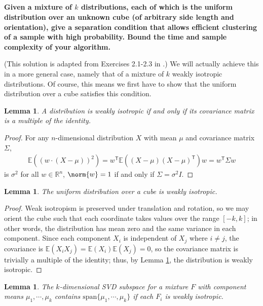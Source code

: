 \documentclass[a4paper,12pt]{article}
\newtheorem{lemma}[theorem]{Lemma}
\theoremstyle{remark}
\newcommand{\transpose}{\mathsf{T}}
\begin{document}
\subsection{}
    \boldmath\textbf{Given a mixture of $k$ distributions, each of which is the uniform distribution over an unknown cube (of arbitrary side length and orientation), give a separation condition that allows efficient clustering of a sample with high probability. Bound the time and sample complexity of your algorithm.
    }\unboldmath \par
    (This solution is adapted from Exercises 2.1-2.3 in \cite{spectral}.) We will actually achieve this in a more general case, namely that of a mixture of $k$ weakly isotropic distributions. Of course, this means we first have to show that the uniform distribution over a cube satisfies this condition.
    \begin{lemma} \label{lem:iso-cov}
        A distribution is weakly isotropic if and only if its covariance matrix is a multiple of the identity.
    \end{lemma}
    \begin{proof}
        For any $n$-dimensional distribution $X$ with mean $\mu$ and covariance matrix $\Sigma$,
        \begin{align*}
            \mathbb{E}((w \cdot (X - \mu))^2) = w^\transpose \mathbb{E}((X - \mu)(X - \mu)^\transpose) w = w^\transpose \Sigma w
        \end{align*}
        is $\sigma^2$ for all $w \in \mathbb{R}^n$, $\norm{w} = 1$ if and only if $\Sigma = \sigma^2 I$.
    \end{proof}
    \begin{lemma}
        The uniform distribution over a cube is weakly isotropic.
    \end{lemma}
    \begin{proof}
        Weak isotropism is preserved under translation and rotation, so we may orient the cube such that each coordinate takes values over the range $[-k, k]$; in other words, the distribution has mean zero and the same variance in each component. Since each component $X_i$ is independent of $X_j$ where $i \neq j$, the covariance is $\mathbb{E}(X_i X_j) = \mathbb{E}(X_i) \mathbb{E}(X_j) = 0$, so the covariance matrix is trivially a multiple of the identity; thus, by Lemma \ref{lem:iso-cov}, the distribution is weakly isotropic.
    \end{proof}
    \begin{lemma}
        The $k$-dimensional SVD subspace for a mixture $F$ with component means $\mu_1, \cdots, \mu_k$ contains $\text{span}\{ \mu_1, \cdots, \mu_k \}$ if each $F_i$ is weakly isotropic.
    \end{lemma}
\end{document}
